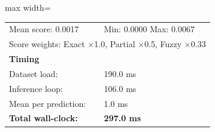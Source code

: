 \begin{table}[htbp]
\begin{adjustbox}{max width=\textwidth}
\begin{tabular}{r p{5cm} r r r r}
\multicolumn{3}{l}{Mean score: 0.0017} & \multicolumn{3}{l}{Min: 0.0000 \quad Max: 0.0067} \\
\multicolumn{6}{l}{Score weights: Exact $\times$1.0, Partial $\times$0.5, Fuzzy $\times$0.33} \\
\midrule
\multicolumn{6}{l}{\textbf{Timing}} \\
\midrule
\multicolumn{3}{l}{Dataset load:} & \multicolumn{3}{l}{190.0 ms} \\
\multicolumn{3}{l}{Inference loop:} & \multicolumn{3}{l}{106.0 ms} \\
\multicolumn{3}{l}{Mean per prediction:} & \multicolumn{3}{l}{1.0 ms} \\
\multicolumn{3}{l}{\textbf{Total wall-clock:}} & \multicolumn{3}{l}{\textbf{297.0 ms}} \\
\bottomrule
\end{tabular}
\end{adjustbox}
\end{table}
